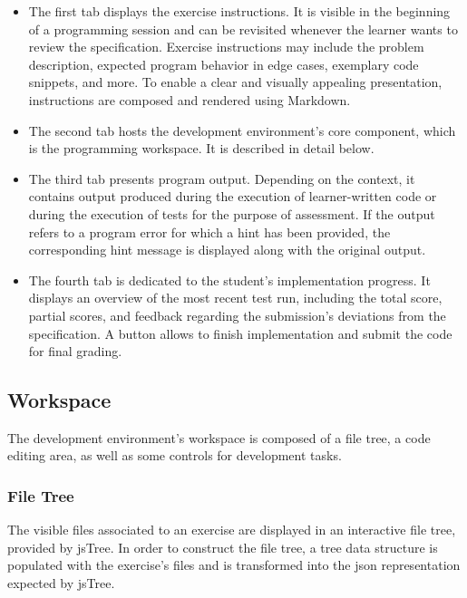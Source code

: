 \begin{itemize}
\item
  The first tab displays the exercise instructions. It is visible in the beginning of a programming session and can be revisited whenever the learner wants to review the specification. Exercise instructions may include the problem description, expected program behavior in edge cases, exemplary code snippets, and more. To enable a clear and visually appealing presentation, instructions are composed and rendered using Markdown.
\item
  The second tab hosts the development environment's core component, which is the programming workspace. It is described in detail below.
\item
  The third tab presents program output. Depending on the context, it contains output produced during the execution of learner-written code or during the execution of tests for the purpose of assessment. If the output refers to a program error for which a hint has been provided, the corresponding hint message is displayed along with the original output.
\item
  The fourth tab is dedicated to the student's implementation progress. It displays an overview of the most recent test run, including the total score, partial scores, and feedback regarding the submission's deviations from the specification. A button allows to finish implementation and submit the code for final grading.
\end{itemize}

\subsection{Workspace}

The development environment's workspace is composed of a file tree, a code editing area, as well as some controls for development tasks.

\subsubsection{File Tree}

The visible files associated to an exercise are displayed in an interactive file tree, provided by jsTree. In order to construct the file tree, a tree data structure is populated with the exercise's files and is transformed into the \gls{json} representation expected by jsTree.

